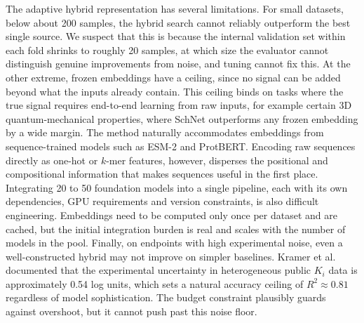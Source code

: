 The adaptive hybrid representation has several limitations. For small datasets, below about 200 samples, the hybrid search cannot reliably outperform the best single source. We suspect that this is because the internal validation set within each fold shrinks to roughly 20 samples, at which size the evaluator cannot distinguish genuine improvements from noise, and tuning cannot fix this. At the other extreme, frozen embeddings have a ceiling, since no signal can be added beyond what the inputs already contain. This ceiling binds on tasks where the true signal requires end-to-end learning from raw inputs, for example certain 3D quantum-mechanical properties, where SchNet outperforms any frozen embedding by a wide margin. The method naturally accommodates embeddings from sequence-trained models such as ESM-2 and ProtBERT. Encoding raw sequences directly as one-hot or $k$-mer features, however, disperses the positional and compositional information that makes sequences useful in the first place. Integrating 20 to 50 foundation models into a single pipeline, each with its own dependencies, GPU requirements and version constraints, is also difficult engineering. Embeddings need to be computed only once per dataset and are cached, but the initial integration burden is real and scales with the number of models in the pool. Finally, on endpoints with high experimental noise, even a well-constructed hybrid may not improve on simpler baselines. Kramer et al.\ \citep{Kramer2012} documented that the experimental uncertainty in heterogeneous public $K_i$ data is approximately 0.54 log units, which sets a natural accuracy ceiling of $R^2 \approx 0.81$ regardless of model sophistication. The budget constraint plausibly guards against overshoot, but it cannot push past this noise floor.


